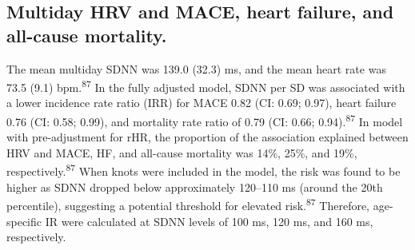 \documentclass[
  letterpaper,
  headsepline=true,
  open=any]{scrbook}
\begin{document}
\restoregeometry

\hypertarget{multiday-hrv-and-mace-heart-failure-and-all-cause-mortality.}{%
\subsection{Multiday HRV and MACE, heart failure, and all-cause
mortality.}\label{multiday-hrv-and-mace-heart-failure-and-all-cause-mortality.}}

The mean multiday SDNN was 139.0 (32.3) ms, and the mean heart rate was
73.5 (9.1) bpm.\textsuperscript{87} In the fully adjusted model, SDNN
per SD was associated with a lower incidence rate ratio (IRR) for MACE
0.82 (CI: 0.69; 0.97), heart failure 0.76 (CI: 0.58; 0.99), and
mortality rate ratio of 0.79 (CI: 0.66; 0.94).\textsuperscript{87} In
model with pre-adjustment for rHR, the proportion of the association
explained between HRV and MACE, HF, and all-cause mortality was 14\%,
25\%, and 19\%, respectively.\textsuperscript{87} When knots were
included in the model, the risk was found to be higher as SDNN dropped
below approximately 120--110 ms (around the 20th percentile), suggesting
a potential threshold for elevated risk.\textsuperscript{87} Therefore,
age-specific IR were calculated at SDNN levels of 100 ms, 120 ms, and
160 ms, respectively.

\end{document}
